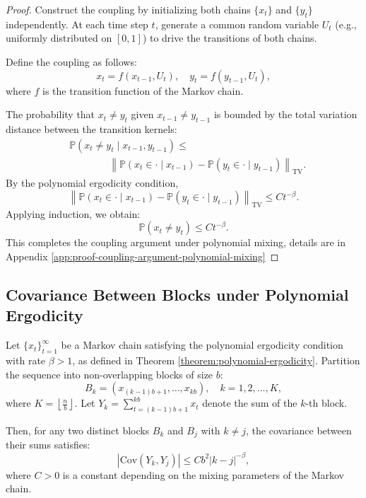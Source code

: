 \begin{proof}
Construct the coupling by initializing both chains \(\{x_t\}\) and \(\{y_t\}\) independently. At each time step \(t\), generate a common random variable \(U_t\) (e.g., uniformly distributed on \([0,1]\)) to drive the transitions of both chains.

Define the coupling as follows:
\[
x_{t} = f(x_{t-1}, U_t), \quad y_{t} = f(y_{t-1}, U_t),
\]
where \(f\) is the transition function of the Markov chain.

The probability that \(x_t \neq y_t\) given \(x_{t-1} \neq y_{t-1}\) is bounded by the total variation distance between the transition kernels:
\begin{align*}
&\mathbb{P}(x_t \neq y_t \mid x_{t-1}, y_{t-1}) \leq\\
&\quad\quad\quad\quad\left\| \mathbb{P}(x_t \in \cdot \mid x_{t-1})- \mathbb{P}(y_t \in \cdot \mid y_{t-1}) \right\|_{\text{TV}}.
\end{align*}
By the polynomial ergodicity condition,
\[
\left\| \mathbb{P}(x_t \in \cdot \mid x_{t-1}) - \mathbb{P}(y_t \in \cdot \mid y_{t-1}) \right\|_{\text{TV}} \leq C t^{-\beta}.
\]
Applying induction, we obtain:
\[
\mathbb{P}(x_t \neq y_t) \leq C t^{-\beta}.
\]
This completes the coupling argument under polynomial mixing, details are in Appendix \ref{app:proof-coupling-argument-polynomial-mixing}
\end{proof}

\subsection{Covariance Between Blocks under Polynomial Ergodicity}

\begin{lemma}
\label{lemma:covariance-between-blocks}
Let \(\{x_t\}_{t=1}^\infty\) be a Markov chain satisfying the polynomial ergodicity condition with rate \(\beta > 1\), as defined in Theorem \ref{theorem:polynomial-ergodicity}. Partition the sequence into non-overlapping blocks of size \(b\):
\[
B_k = (x_{(k-1)b + 1}, \ldots, x_{kb}), \quad k = 1, 2, \ldots, K,
\]
where \(K = \left\lfloor \frac{n}{b} \right\rfloor\). Let \(Y_k = \sum_{t=(k-1)b + 1}^{kb} x_t\) denote the sum of the \(k\)-th block.

Then, for any two distinct blocks \(B_k\) and \(B_j\) with \(k \neq j\), the covariance between their sums satisfies:
\[
|\text{Cov}(Y_k, Y_j)| \leq C b^2 |k - j|^{-\beta},
\]
where \(C > 0\) is a constant depending on the mixing parameters of the Markov chain.
\end{lemma}

